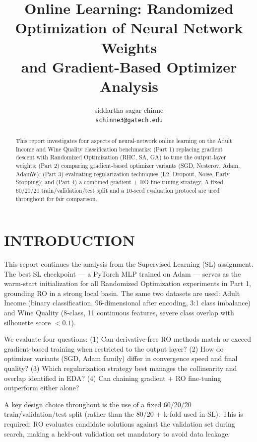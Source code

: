 \documentclass[letterpaper, 10 pt, conference]{ieeeconf}
\title{\LARGE \bf
Online Learning: Randomized Optimization of Neural Network Weights\\
and Gradient-Based Optimizer Analysis
}
\author{siddartha sagar chinne \\
{\tt\small schinne3@gatech.edu}
}
\begin{document}
\maketitle
\thispagestyle{empty}
\pagestyle{empty}

\begin{abstract}
This report investigates four aspects of neural-network online learning on the Adult Income and Wine Quality classification benchmarks: (Part 1) replacing gradient descent with Randomized Optimization (RHC, SA, GA) to tune the output-layer weights; (Part 2) comparing gradient-based optimizer variants (SGD, Nesterov, Adam, AdamW); (Part 3) evaluating regularization techniques (L2, Dropout, Noise, Early Stopping); and (Part 4) a combined gradient + RO fine-tuning strategy. A fixed 60/20/20 train/validation/test split and a 10-seed evaluation protocol are used throughout for fair comparison.
\end{abstract}

\section{INTRODUCTION}

This report continues the analysis from the Supervised Learning (SL) assignment. The best SL checkpoint --- a PyTorch MLP trained on Adam --- serves as the warm-start initialization for all Randomized Optimization experiments in Part 1, grounding RO in a strong local basin. The same two datasets are used: Adult Income (binary classification, 96-dimensional after encoding, 3:1 class imbalance) and Wine Quality (8-class, 11 continuous features, severe class overlap with silhouette score $< 0.1$).

We evaluate four questions: (1) Can derivative-free RO methods match or exceed gradient-based training when restricted to the output layer? (2) How do optimizer variants (SGD, Adam family) differ in convergence speed and final quality? (3) Which regularization strategy best manages the collinearity and overlap identified in EDA? (4) Can chaining gradient + RO fine-tuning outperform either alone?

A key design choice throughout is the use of a fixed 60/20/20 train/validation/test split (rather than the 80/20 + k-fold used in SL). This is required: RO evaluates candidate solutions against the validation set during search, making a held-out validation set mandatory to avoid data leakage.
\end{document}
